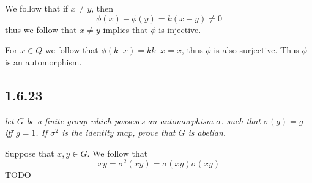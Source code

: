 \documentclass[11pt,oneside,titlepage]{book}
\DeclareMathOperator \inv {^{-1}}
\begin{document}
We follow that if $x \neq y$, then
$$\phi(x) - \phi(y) = k(x - y) \neq 0$$
thus we follow that $x \neq y$ implies that $\phi$ is injective.

For $x \in Q$ we follow that $\phi(k\inv x) = k k\inv x = x$, thus $\phi$ is
also surjective. Thus $\phi$ is an automorphism.

\subsection*{1.6.23}

\textit{let $G$ be a finite group which posseses an automorphism $\sigma$.
  such that $\sigma(g) = g$ iff $g = 1$. If $\sigma^2$ is the identity map, prove that
  $G$ is abelian.}

Suppose that $x, y \in G$. We follow that
$$xy = \sigma^2(xy) = \sigma(xy)\sigma(xy)$$
TODO
\end{document}
